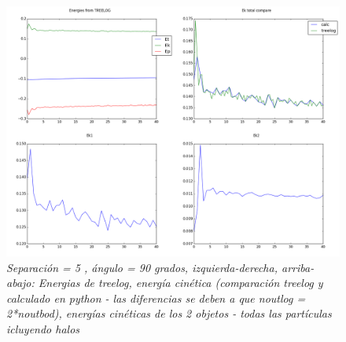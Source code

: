 \documentclass[12pt]{article} %
\renewcommand{\=}[1]{\stackrel{#1}{=}} %
\theoremstyle{definition}
\theoremstyle{remark}
\begin{document}
\begin{figure}[!ht]
 \centering
 \includegraphics[scale=0.2]{sep590deg-energy.png}
 \caption{\emph{ Separación = 5 , ángulo = 90 grados, izquierda-derecha, arriba-abajo: Energias de treelog, energía cinética (comparación treelog y calculado en python - las diferencias se deben a que noutlog = 2*noutbod), energías cinéticas de los 2 objetos - todas las partículas icluyendo halos }}
\end{figure}



\clearpage
\newpage
\end{document}

